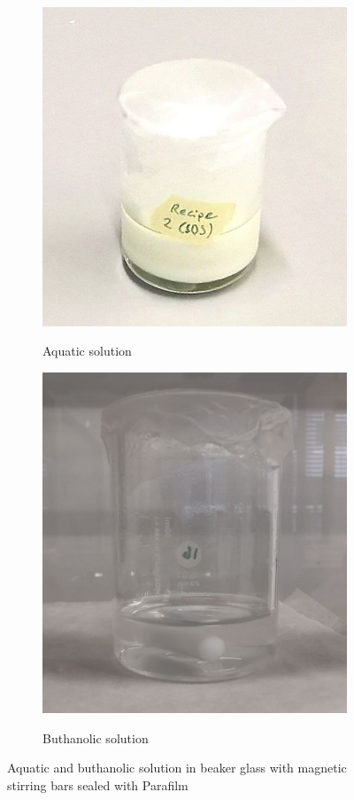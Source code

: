 \documentclass[a4paper]{article}
\begin{document}
\begin{figure}[htb]
	\centering
	\begin{subfigure}{0.49\textwidth}
		\centering
		\includegraphics[height=0.8\textwidth]{Pics/sol-aq.png}
		\label{fig:sol-aq}
		\caption{Aquatic solution}
	\end{subfigure}
	\begin{subfigure}{0.49\textwidth}
		\centering
		\includegraphics[height=0.8\textwidth]{Pics/sol-bu.png}
		\label{fig:sol-bu}
		\caption{Buthanolic solution}
	\end{subfigure}
	\label{fig:sol}
	\caption{Aquatic and buthanolic solution in beaker glass with magnetic stirring bars sealed with Parafilm} 
\end{figure}
\end{document}
